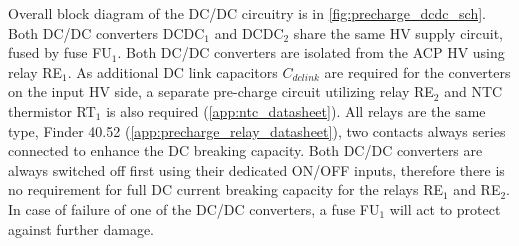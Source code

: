 Overall block diagram of the DC/DC circuitry is in \ref{fig:precharge_dcdc_sch}. Both DC/DC converters DCDC$_1$ and DCDC$_2$ share the same HV supply circuit, fused by fuse FU$_1$. Both DC/DC converters are isolated from the ACP HV using relay RE$_1$. As additional DC link capacitors $C_{dclink}$ are required for the converters on the input HV side, a separate pre-charge circuit utilizing relay RE$_2$ and NTC thermistor RT$_1$ is also required (\ref{app:ntc_datasheet}). 
All relays are the same type, Finder 40.52 (\ref{app:precharge_relay_datasheet}), two contacts always series connected to enhance the DC breaking capacity. Both DC/DC converters are always switched off first using their dedicated ON/OFF inputs, therefore there is no requirement for full DC current breaking capacity for the relays RE$_1$ and RE$_2$. In case of failure of one of the DC/DC converters, a fuse FU$_1$ will act to protect against further damage.

